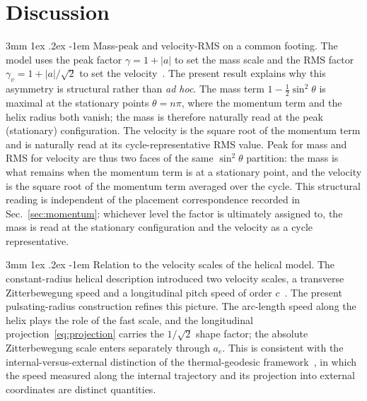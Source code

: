 \documentclass[%
 reprint, amsmath,amssymb, aps, prb, ]{revtex4-2}
\makeatletter
\numberwithin{equation}{section}
\renewcommand\paragraph{%
  \@startsection{paragraph}{4}{\z@}%
    {3mm \@plus 1ex \@minus .2ex}%
    {-1em}%
    {\normalfont\normalsize\itshape}}
\makeatother
\begin{document}
\section{Discussion}
\label{sec:discussion}

\paragraph{Mass-peak and velocity-RMS on a common footing.}
The model uses the peak factor $\gamma=1+\lvert a\rvert$ to set the mass scale and the RMS factor $\gamma_v=1+\lvert a\rvert/\sqrt{2}$ to set the velocity~\cite{hanamura61}. The present result explains why this asymmetry is structural rather than \emph{ad hoc}. The mass term $1-\tfrac{1}{2}\sin^2\theta$ is maximal at the stationary points $\theta=n\pi$, where the momentum term and the helix radius both vanish; the mass is therefore naturally read at the peak (stationary) configuration. The velocity is the square root of the momentum term and is naturally read at its cycle-representative RMS value. Peak for mass and RMS for velocity are thus two faces of the same $\sin^2\theta$ partition: the mass is what remains when the momentum term is at a stationary point, and the velocity is the square root of the momentum term averaged over the cycle. This structural reading is independent of the placement correspondence recorded in Sec.~\ref{sec:momentum}: whichever level the factor is ultimately assigned to, the mass is read at the stationary configuration and the velocity as a cycle representative.

\paragraph{Relation to the velocity scales of the helical model.}
The constant-radius helical description introduced two velocity scales, a transverse Zitterbewegung speed and a longitudinal pitch speed of order $c$~\cite{hanamura51}. The present pulsating-radius construction refines this picture. The arc-length speed along the helix plays the role of the fast scale, and the longitudinal projection~\eqref{eq:projection} carries the $1/\sqrt{2}$ shape factor; the absolute Zitterbewegung scale enters separately through $a_e$. This is consistent with the internal-versus-external distinction of the thermal-geodesic framework~\cite{hanamura24}, in which the speed measured along the internal trajectory and its projection into external coordinates are distinct quantities.
\end{document}
